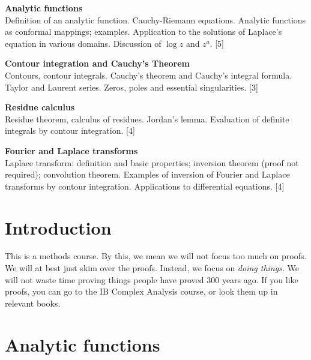 \documentclass[a4paper]{article}
\begin{document}
\maketitle
{\small
\noindent\textbf{Analytic functions}\\
Definition of an analytic function. Cauchy-Riemann equations. Analytic functions as conformal mappings; examples. Application to the solutions of Laplace's equation in various domains. Discussion of $\log z$ and $z^a$.\hspace*{\fill} [5]

\vspace{10pt}
\noindent\textbf{Contour integration and Cauchy's Theorem}\\
Contours, contour integrals. Cauchy's theorem and Cauchy's integral formula. Taylor and Laurent series. Zeros, poles and essential singularities.\hspace*{\fill} [3]

\vspace{10pt}
\noindent\textbf{Residue calculus}\\
Residue theorem, calculus of residues. Jordan's lemma. Evaluation of definite integrals by contour integration.\hspace*{\fill} [4]

\vspace{10pt}
\noindent\textbf{Fourier and Laplace transforms}\\
Laplace transform: definition and basic properties; inversion theorem (proof not required); convolution theorem. Examples of inversion of Fourier and Laplace transforms by contour integration. Applications to differential equations.\hspace*{\fill} [4]}

\tableofcontents

\setcounter{section}{-1}
\section{Introduction}
This is a methods course. By this, we mean we will not focus too much on proofs. We will at best just skim over the proofs. Instead, we focus on \emph{doing things}. We will not waste time proving things people have proved 300 years ago. If you like proofs, you can go to the IB Complex Analysis course, or look them up in relevant books.

\section{Analytic functions}
\end{document}
